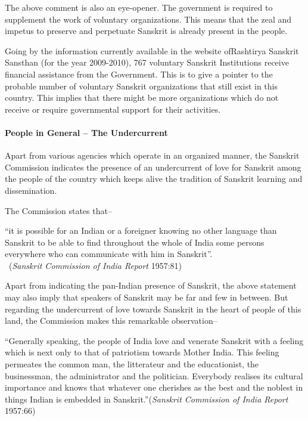 The above comment is also an eye-opener. The government is required to supplement the work of voluntary organizations. This means that the zeal and impetus to preserve and perpetuate Sanskrit is already present in the people.

Going by the information currently available in the website of\break Rashtirya Sanskrit Sansthan (for the year 2009-2010), 767 voluntary Sanskrit Institutions receive financial assistance from the Government. This is to give a pointer to the probable number of voluntary Sanskrit organizations that still exist in this country. This implies that there might be more organizations which do not receive or require governmental support for their activities.   

\paragraph{People in General – The Undercurrent }

Apart from various agencies which operate in an organized manner, the Sanskrit Commission indicates the presence of an undercurrent of love for Sanskrit among the people of the country which keeps alive the tradition of Sanskrit learning and dissemination.

The Commission states that– 
\begin{myquote}
\eleven
“it is possible for an Indian or a foreigner knowing no other language than Sanskrit to be able to find throughout the whole of India some persons everywhere who can communicate with him in Sanskrit”.\\[-15pt] 

~\hfill ({\sl Sanskrit Commission of India Report} 1957:81)
\end{myquote}

Apart from indicating the pan-Indian presence of Sanskrit, the above statement may also imply that speakers of Sanskrit may be far and few in between. But regarding the undercurrent of love towards Sanskrit in the heart of people of this land, the Commission makes this remarkable observation–
\begin{myquote}
\eleven
“Generally speaking, the people of India love and venerate Sanskrit with a feeling which is next only to that of patriotism towards Mother India. This feeling permeates the common man, the litterateur and the educationist, the businessman, the administrator and the politician. Everybody realises its cultural importance and knows that whatever one cherishes as the best and the noblest in things Indian is embedded in Sanskrit.”\hfill ({\sl Sanskrit Commission of India Report} 1957:66)
\end{myquote}


